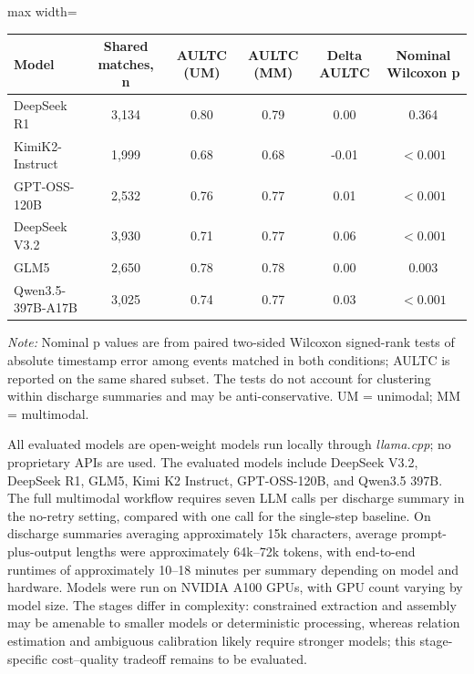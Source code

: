 \par\medskip
\noindent\begin{minipage}{\textwidth}
\small
{}
\centering
\begin{adjustbox}{max width=\textwidth}
\begin{tabular}{@{}lccccc@{}}
\toprule
\textbf{Model} & \textbf{Shared matches, n} & \textbf{AULTC (UM)} & \textbf{AULTC (MM)} & \textbf{Delta AULTC} & \textbf{Nominal Wilcoxon p} \\
\midrule
DeepSeek R1 & 3,134 & 0.80 & 0.79 & 0.00 & 0.364 \\
KimiK2-Instruct & 1,999 & 0.68 & 0.68 & -0.01 & $<0.001$ \\
GPT-OSS-120B & 2,532 & 0.76 & 0.77 & 0.01 & $<0.001$ \\
DeepSeek V3.2 & 3,930 & 0.71 & 0.77 & 0.06 & $<0.001$ \\
GLM5 & 2,650 & 0.78 & 0.78 & 0.00 & 0.003 \\
Qwen3.5-397B-A17B & 3,025 & 0.74 & 0.77 & 0.03 & $<0.001$ \\
\bottomrule
\end{tabular}
\end{adjustbox}
\par\vspace{0.3em}
\begin{minipage}{\textwidth}
\footnotesize\textit{Note:} Nominal p values are from paired two-sided Wilcoxon signed-rank tests of absolute timestamp error among events matched in both conditions; AULTC is reported on the same shared subset. The tests do not account for clustering within discharge summaries and may be anti-conservative. UM = unimodal; MM = multimodal.
\end{minipage}
\end{minipage}\par\medskip

\noindent
All evaluated models are open-weight models run locally through \textit{llama.cpp}; no proprietary APIs are used. The evaluated models include DeepSeek V3.2, DeepSeek R1, GLM5, Kimi K2 Instruct, GPT-OSS-120B, and Qwen3.5 397B. The full multimodal workflow requires seven LLM calls per discharge summary in the no-retry setting, compared with one call for the single-step baseline. On discharge summaries averaging approximately 15k characters, average prompt-plus-output lengths were approximately 64k--72k tokens, with end-to-end runtimes of approximately 10--18 minutes per summary depending on model and hardware. Models were run on NVIDIA A100 GPUs, with GPU count varying by model size. The stages differ in complexity: constrained extraction and assembly may be amenable to smaller models or deterministic processing, whereas relation estimation and ambiguous calibration likely require stronger models; this stage-specific cost--quality tradeoff remains to be evaluated.

